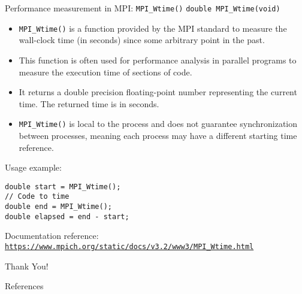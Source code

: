 \documentclass{beamer}
\begin{document}
\begin{frame}[fragile]{Performance measurement in MPI: \texttt{MPI\_Wtime()}}
  \texttt{double MPI\_Wtime(void)}

  \begin{itemize}
    \item \texttt{MPI\_Wtime()} is a function provided by the MPI standard to measure the wall-clock time (in seconds) since some arbitrary point in the past.
    \item This function is often used for performance analysis in parallel programs to measure the execution time of sections of code.
    \item It returns a double precision floating-point number representing the current time. The returned time is in seconds.
    \item \texttt{MPI\_Wtime()} is local to the process and does not guarantee synchronization between processes, meaning each process may have a different starting time reference.
  \end{itemize}

  Usage example:
  \lstset{style=CStyle}
  \begin{lstlisting}
double start = MPI_Wtime();
// Code to time
double end = MPI_Wtime();
double elapsed = end - start;
  \end{lstlisting}

  Documentation reference: \texttt{\href{https://www.mpich.org/static/docs/v3.2/www3/MPI_Wtime.html}{https://www.mpich.org/static/docs/v3.2/www3/MPI\_Wtime.html}}
\end{frame}


\begin{frame}
    \centering
    \Huge{Thank You!}
\end{frame}

\begin{frame}{References}
\end{frame}
\end{document}
